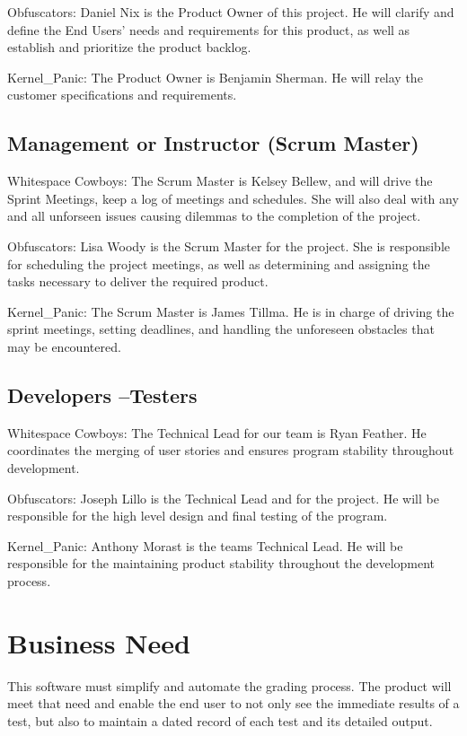 Obfuscators:
Daniel Nix is the Product Owner of this project.  He will clarify and define the End Users' needs and requirements 
for this product, as well as establish and prioritize the product backlog.


Kernel\_Panic:
The Product Owner is Benjamin Sherman. He will relay the customer specifications and requirements.
 
\subsection{Management or Instructor (Scrum Master)}
Whitespace Cowboys:
The Scrum Master is Kelsey Bellew, and will drive the Sprint Meetings, keep a log of
meetings and schedules. She will also deal with any and all unforseen issues causing 
dilemmas to the completion of the project.

Obfuscators:
Lisa Woody is the Scrum Master for the project.  She is responsible for scheduling the project meetings, as well as 
determining and assigning the tasks necessary to deliver the required product.

Kernel\_Panic: The Scrum Master is James Tillma. He is in charge of driving the sprint meetings, setting deadlines, and handling the unforeseen obstacles that may be encountered.

\subsection{Developers --Testers}
Whitespace Cowboys:
The Technical Lead for our team is Ryan Feather.  He coordinates the merging of user stories and ensures
 program stability throughout development.

Obfuscators:
Joseph Lillo is the Technical Lead and for the project.  He will be responsible for the high level design and final
testing of the program.

Kernel\_Panic:
Anthony Morast is the teams Technical Lead. He will be responsible for the maintaining product stability throughout the development process.


\section{Business Need}
This software must simplify and automate the grading process.  The product will meet that need and enable 
the end user to not only see the immediate results of a test, but also to maintain a dated record of each test
and its detailed output.

